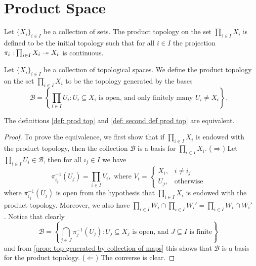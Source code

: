 \section{Product Space}

\begin{definition}
    \label{def: prod top}
    Let \(\{X_i\}_{i \in I}\) be a collection of sets. The product topology on the
    set \(\prod_{i \in I} X_i\) is defined to be the initial topology such that
    for all \(i \in I\) the projection \(\pi_i : \prod_{i \in I} X_i \twoheadrightarrow X_i\) is
    continuous.
\end{definition}

\begin{definition}
    \label{def: second def prod top}
    Let \(\{X_i\}_{i \in I}\) be a collection of topological spaces. We
    define the product topology on the set \(\prod_{i \in I} X_i\) to be the
    topology generated by the bases
    \[
        \mathcal B = \left\{ \prod_{i \in I} U_i \colon U_i \subseteq X_i
        \text{ is open, and only finitely many } U_i \neq X_i \right\}.
    \]
\end{definition}

\begin{corollary}\label{cor: equivalent defs prod top}
    The definitions \ref{def: prod top} and \ref{def: second def prod top}
    are equivalent.
\end{corollary}

\begin{proof}
    To prove the equivalence, we first show that if \(\prod_{i \in I} X_i\) is
    endowed with the product topology, then the collection \(\mathcal B\) is a
    basis for \(\prod_{i \in I} X_i\). (\(\Rightarrow\)) Let \(\prod_{i \in I} U_i
    \in \mathcal B\), then for all \(i_j \in I\) we have
    \[
        \pi_{i_j}^{-1}(U_j) = \prod_{i \in I} V_i, \text{ where } V_i =
        \begin{cases}
            X_i, & i \neq i_j       \\
            U_j, & \text{otherwise}
        \end{cases}
    \]
    where \(\pi_{i_j}^{-1}(U_j)\) is open from the hypothesis that \(\prod_{i
        \in I} X_i\) is endowed with the product topology. Moreover, we also have
    \(\prod_{i \in I} W_i \cap \prod_{i \in I} W_i' = \prod_{i \in I} W_i \cap
    W_i'\). Notice that clearly
    \[
        \mathcal B = \left\{ \bigcap_{j \in J} \pi_j^{-1}(U_j) \colon U_j \subseteq X_j
        \text{ is open, and } J \subseteq I \text{ is finite}\right\}
    \]
    and from \cref{prop: top generated by collection of maps} this shows that
    \(\mathcal B\) is a basis for the product topology. (\(\Leftarrow\)) The
    converse is clear.
\end{proof}

